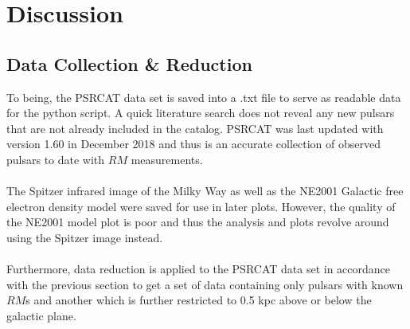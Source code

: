 \documentclass[12pt]{article}
\begin{document}
\section{Discussion}

\subsection{Data Collection \& Reduction}
	To being, the PSRCAT data set is saved into a .txt file to serve as readable data for the python script. A quick literature search does not reveal any new pulsars that are not already included in the catalog. PSRCAT was last updated with version 1.60 in December 2018 and thus is an accurate collection of observed pulsars to date with $RM$ measurements. 
	\\
	\\
	The Spitzer infrared image of the Milky Way as well as the NE2001 Galactic free electron density model were saved for use in later plots. However, the quality of the NE2001 model plot is poor and thus the analysis and plots revolve around using the Spitzer image instead.
	\\
	\\
	Furthermore, data reduction is applied to the PSRCAT data set in accordance with the previous section to get a set of data containing only pulsars with known $RM$s and another which is further restricted to 0.5 kpc above or below the galactic plane.
\end{document}
